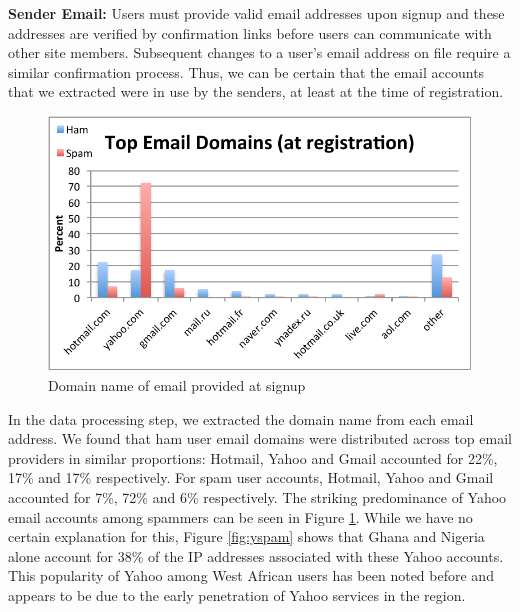 \documentclass[preprint]{acm_proc_article-sp}
\begin{document}
\textbf{Sender Email:} Users must provide valid email addresses upon signup and these addresses are 
verified by confirmation links before users can communicate with other site members. Subsequent changes 
to a user's email address on file require a similar confirmation process. Thus, we can be certain 
that the email accounts that we extracted were in use by the senders, at least at the time of registration. 

\begin{figure}[h]
    \centering
    \includegraphics[width=\linewidth]{figures/email.pdf}
    \caption{Domain name of email provided at signup}
    \label{fig:email}
\end{figure}

In the data processing step, we extracted the domain name from each email address. We found that ham user email domains 
were distributed across top email providers in similar proportions: Hotmail, Yahoo and Gmail accounted for 22\%, 17\% and 17\% 
respectively. For spam user accounts, Hotmail, Yahoo and Gmail accounted for 7\%, 72\% and 6\% respectively. The striking 
predominance of Yahoo email accounts among spammers can be seen in Figure \ref{fig:email}. While we have no certain 
explanation for this, Figure \ref{fig:yspam} shows that Ghana and Nigeria alone account for 38\% of the IP 
addresses associated with these Yahoo accounts. This popularity of Yahoo among West African users has 
been noted before\cite{burrell} and appears to be due to the early penetration of Yahoo services in the region.
\end{document}
